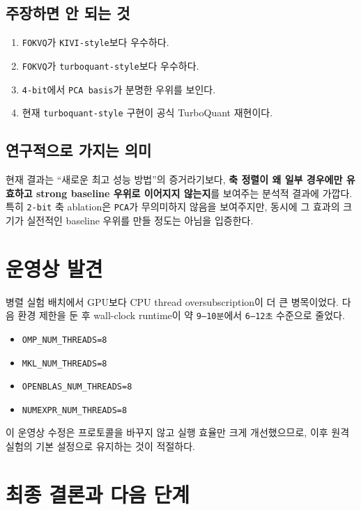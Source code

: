 \documentclass[11pt,a4paper]{article}
\begin{document}
\subsection{주장하면 안 되는 것}

\begin{enumerate}
\item \texttt{FOKVQ}가 \texttt{KIVI-style}보다 우수하다.
\item \texttt{FOKVQ}가 \texttt{turboquant-style}보다 우수하다.
\item \texttt{4-bit}에서 \texttt{PCA basis}가 분명한 우위를 보인다.
\item 현재 \texttt{turboquant-style} 구현이 공식 TurboQuant 재현이다.
\end{enumerate}

\subsection{연구적으로 가지는 의미}

현재 결과는 ``새로운 최고 성능 방법''의 증거라기보다, \textbf{축 정렬이 왜 일부 경우에만 유효하고 strong baseline 우위로 이어지지 않는지}를 보여주는 분석적 결과에 가깝다. 특히 \texttt{2-bit} 축 ablation은 \texttt{PCA}가 무의미하지 않음을 보여주지만, 동시에 그 효과의 크기가 실전적인 baseline 우위를 만들 정도는 아님을 입증한다.

\section{운영상 발견}

병렬 실험 배치에서 GPU보다 CPU thread oversubscription이 더 큰 병목이었다. 다음 환경 제한을 둔 후 wall-clock runtime이 약 \texttt{9--10분}에서 \texttt{6--12초} 수준으로 줄었다.

\begin{itemize}
\item \texttt{OMP\_NUM\_THREADS=8}
\item \texttt{MKL\_NUM\_THREADS=8}
\item \texttt{OPENBLAS\_NUM\_THREADS=8}
\item \texttt{NUMEXPR\_NUM\_THREADS=8}
\end{itemize}

이 운영상 수정은 프로토콜을 바꾸지 않고 실행 효율만 크게 개선했으므로, 이후 원격 실험의 기본 설정으로 유지하는 것이 적절하다.

\section{최종 결론과 다음 단계}
\end{document}
